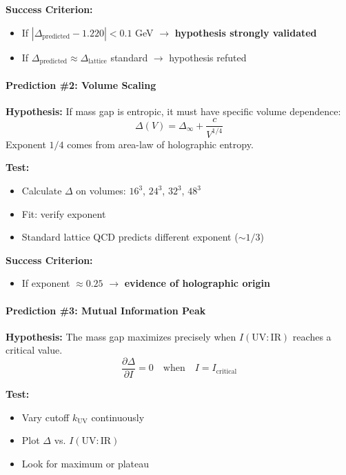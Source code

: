\documentclass[11pt]{article}
\theoremstyle{definition}
\theoremstyle{remark}
\begin{document}
\textbf{Success Criterion:}
\begin{itemize}
\item If $|\Delta_{\text{predicted}} - 1.220| < 0.1$ GeV $\to$ \textbf{hypothesis strongly validated}
\item If $\Delta_{\text{predicted}} \approx \Delta_{\text{lattice}}$ standard $\to$ hypothesis refuted
\end{itemize}

\paragraph{Prediction \#2: Volume Scaling}

\textbf{Hypothesis:}
If mass gap is entropic, it must have specific volume dependence:
\[
\Delta(V) = \Delta_\infty + \frac{c}{V^{1/4}}
\]
Exponent $1/4$ comes from area-law of holographic entropy.

\textbf{Test:}
\begin{itemize}
\item Calculate $\Delta$ on volumes: $16^3$, $24^3$, $32^3$, $48^3$
\item Fit: verify exponent
\item Standard lattice QCD predicts different exponent ($\sim 1/3$)
\end{itemize}

\textbf{Success Criterion:}
\begin{itemize}
\item If exponent $\approx 0.25$ $\to$ \textbf{evidence of holographic origin}
\end{itemize}

\paragraph{Prediction \#3: Mutual Information Peak}

\textbf{Hypothesis:}
The mass gap maximizes precisely when $I(\text{UV}:\text{IR})$ reaches a critical value.
\[
\frac{\partial \Delta}{\partial I} = 0 \quad \text{when} \quad I = I_{\text{critical}}
\]

\textbf{Test:}
\begin{itemize}
\item Vary cutoff $k_{\text{UV}}$ continuously
\item Plot $\Delta$ vs. $I(\text{UV}:\text{IR})$
\item Look for maximum or plateau
\end{itemize}
\end{document}
